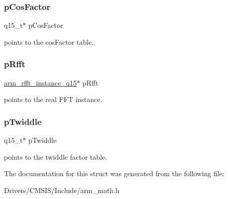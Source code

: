 \subsubsection{\texorpdfstring{p\+Cos\+Factor}{pCosFactor}}
{\footnotesize\ttfamily q15\+\_\+t$\ast$ p\+Cos\+Factor}

points to the cos\+Factor table. \mbox{\label{structarm__dct4__instance__q15_aea6aa42c838f2b22c8c31e9e259b8d75}} 
\subsubsection{\texorpdfstring{p\+Rfft}{pRfft}}
{\footnotesize\ttfamily \mbox{\hyperlink{structarm__rfft__instance__q15}{arm\+\_\+rfft\+\_\+instance\+\_\+q15}}$\ast$ p\+Rfft}

points to the real F\+FT instance. \mbox{\label{structarm__dct4__instance__q15_aa8c837c05b2c910342ab8f171d30dc02}} 
\subsubsection{\texorpdfstring{p\+Twiddle}{pTwiddle}}
{\footnotesize\ttfamily q15\+\_\+t$\ast$ p\+Twiddle}

points to the twiddle factor table. 

The documentation for this struct was generated from the following file\+:\begin{DoxyCompactItemize}
\item 
Drivers/\+C\+M\+S\+I\+S/\+Include/arm\+\_\+math.\+h\end{DoxyCompactItemize}
